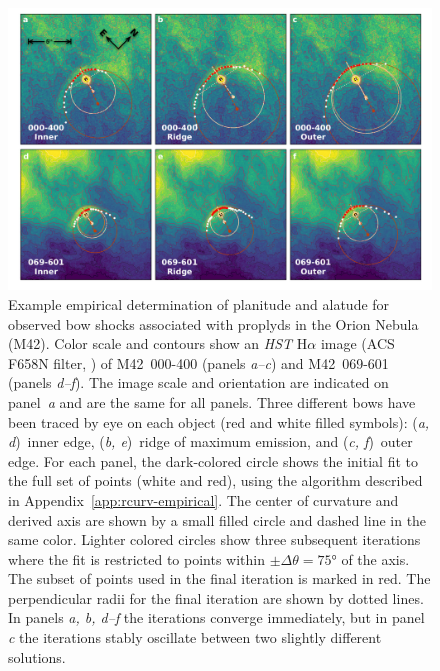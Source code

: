 \begin{figure}
  \centering
  \includegraphics[width=\linewidth]{figs/new-two-arc-multi-fig}
  \caption[]{Example empirical determination of planitude and alatude
    for observed bow shocks associated with proplyds in the Orion
    Nebula (M42).  Color scale and contours show an \textit{HST}
    H\(\alpha\) image (ACS F658N filter, \citealp{Bally:2006a}) of
    M42~000-400 (panels \textit{a--c}) and M42~069-601 (panels
    \textit{d--f}).  The image scale and orientation are indicated on
    panel~\textit{a} and are the same for all panels.  Three different
    bows have been traced by eye on each object (red and white filled
    symbols): (\textit{a, d})~inner edge, (\textit{b, e})~ridge of
    maximum emission, and (\textit{c, f})~outer edge.  For each panel,
    the dark-colored circle shows the initial fit to the full set of
    points (white and red), using the algorithm described in
    Appendix~\ref{app:rcurv-empirical}.  The center of curvature and
    derived axis are shown by a small filled circle and dashed line in
    the same color. Lighter colored circles show three subsequent
    iterations where the fit is restricted to points within
    \(\pm \Delta\theta = \ang{75}\) of the axis.  The subset of points used in
    the final iteration is marked in red.  The perpendicular radii for
    the final iteration are shown by dotted lines. In panels
    \textit{a, b, d--f} the iterations converge immediately, but in
    panel \textit{c} the iterations stably oscillate between two
    slightly different solutions. }
  \label{fig:000-400-fit}
\end{figure}

